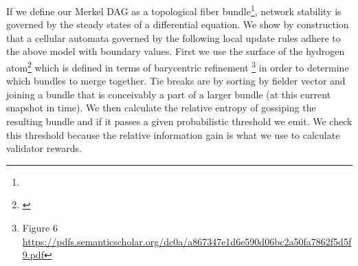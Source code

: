 \documentclass{article}
\begin{document}
If we define our Merkel DAG as a topological fiber bundle\footnote{}, network stability is governed by the steady states of a differential equation. We show by construction that a cellular automata governed by the following local update rules adhere to the above model with boundary values. First we use the surface of the hydrogen atom\footnote{\url{}} which is defined in terms of barycentric refinement  \footnote{Figure 6  \url{https://pdfs.semanticscholar.org/dc0a/a867347e1d6e590d06bc2a50fa7862f5d5f9.pdf}} in order to determine which bundles to merge together. Tie breaks are by sorting by fielder vector and joining a bundle that is conceivably a part of a larger bundle (at this current snapshot in time). We then calculate the relative entropy of gossiping the resulting bundle and if it passes a given probabilistic threshold we emit. We check this threshold because the relative information gain is what we use to calculate validator rewards. 
\end{document}
